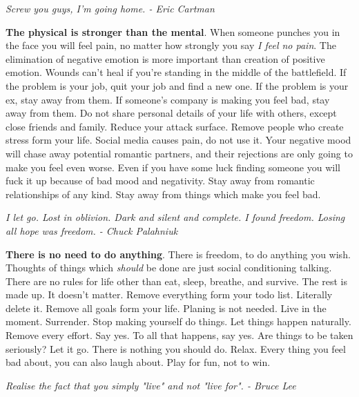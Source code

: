 \documentclass[a4paper,hidelinks]{article}
\begin{document}
\begin{center}
\textit{
Screw you guys, I'm going home.  - Eric Cartman
}
\end{center}

\textbf{The physical is stronger than the mental}.
When someone punches you in the face you will feel pain, no matter how strongly you say \textit{I feel no pain}.
The elimination of negative emotion is more important than creation of positive emotion.
Wounds can't heal if you're standing in the middle of the battlefield.
If the problem is your job, quit your job and find a new one.
If the problem is your ex, stay away from them.
If someone's company is making you feel bad, stay away from them.
Do not share personal details of your life with others, except close friends and family.
Reduce your attack surface.
Remove people who create stress form your life.
Social media causes pain, do not use it.
Your negative mood will chase away potential romantic partners, and their rejections are only going to make you feel even worse.
Even if you have some luck finding someone you will fuck it up because of bad mood and negativity.
Stay away from romantic relationships of any kind.
Stay away from things which make you feel bad.

\newpage

\begin{center}
\textit{
I let go.  Lost in oblivion.  Dark and silent and complete.  I found freedom.  Losing all hope was freedom. - Chuck Palahniuk
}
\end{center}

\textbf{There is no need to do anything}.
There is freedom, to do anything you wish.
Thoughts of things which \textit{should} be done are just social conditioning talking.
There are no rules for life other than eat, sleep, breathe, and survive.
The rest is made up.
It doesn't matter.
Remove everything form your todo list.
Literally delete it.
Remove all goals form your life.
Planing is not needed.
Live in the moment.
Surrender.
Stop making yourself do things.
Let things happen naturally.
Remove every effort.
Say yes.
To all that happens, say yes.
Are things to be taken seriously?
Let it go.
There is nothing you should do.
Relax.
Every thing you feel bad about, you can also laugh about.
Play for fun, not to win.

\newpage

\begin{center}
\textit{
Realise the fact that you simply "live" and not "live for". - Bruce Lee
}
\end{center}
\end{document}
